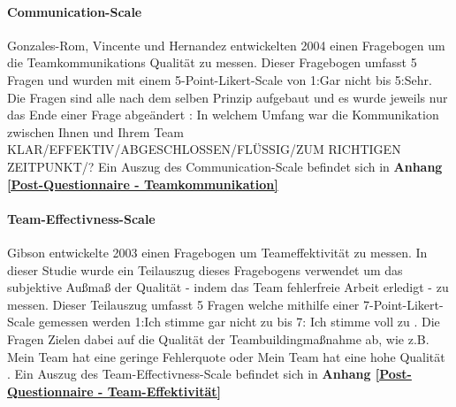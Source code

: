 \documentclass[a4paper,11pt]{article}%
\renewcommand{\\}{\vspace*{0.5\baselineskip} \newline}
\begin{document}
		\paragraph{Communication-Scale}
Gonzales-Rom, Vincente und Hernandez \citep[p.1049]{gonzalez2014climate}entwickelten 2004 einen Fragebogen um die Teamkommunikations Qualität zu messen. Dieser Fragebogen umfasst 5 Fragen und wurden mit einem 5-Point-Likert-Scale von \dq{}1:Gar nicht\dq{} bis \dq{}5:Sehr\dq{}. Die Fragen sind alle nach dem selben Prinzip aufgebaut und es wurde jeweils nur das Ende einer Frage abgeändert : \dq{}In welchem Umfang war die Kommunikation zwischen Ihnen und Ihrem Team KLAR/EFFEKTIV/ABGESCHLOSSEN/FLÜSSIG/ZUM RICHTIGEN ZEITPUNKT/?\dq{} 
\\Ein Auszug des Communication-Scale befindet sich in \textbf{Anhang \ref{Post-Questionnaire - Teamkommunikation}}

		\paragraph{Team-Effectivness-Scale}
Gibson \citep[p.469]{gibson2003team} entwickelte 2003 einen Fragebogen um Teameffektivität zu messen. In dieser Studie wurde ein Teilauszug dieses Fragebogens verwendet um das subjektive Außmaß der Qualität - indem das Team fehlerfreie Arbeit erledigt - zu messen. Dieser Teilauszug umfasst 5 Fragen welche mithilfe einer 7-Point-Likert-Scale gemessen werden \dq{}1:Ich stimme gar nicht zu \dq{} bis \dq{}7: Ich stimme voll zu \dq{}. Die Fragen Zielen dabei auf die Qualität der Teambuildingmaßnahme ab, wie z.B. \dq{}Mein Team hat eine geringe Fehlerquote \dq{} oder \dq{}Mein Team hat eine hohe Qualität \dq{}. 
\\Ein Auszug des Team-Effectivness-Scale befindet sich in \textbf{Anhang \ref{Post-Questionnaire - Team-Effektivität}}

\end{document}
